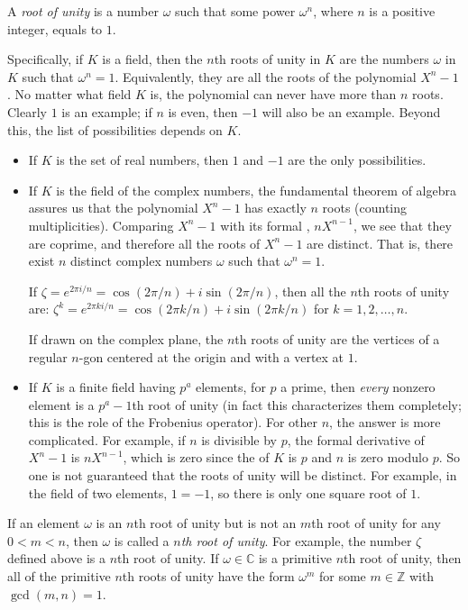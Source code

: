 \documentclass[12pt]{article}
\begin{document}
A \emph{root of unity} is a number $\omega$ such that some power
$\omega^n$, where $n$ is a positive integer, equals to $1$.

Specifically, if $K$ is a field, then the $n$th roots of unity in $K$
are the numbers $\omega$ in $K$ such that $\omega^n = 1$.
Equivalently, they are all the roots of the polynomial $X^n-1$. No
matter what field $K$ is, the polynomial can never have more than $n$
roots.  Clearly $1$ is an example; if $n$ is even, then $-1$ will also
be an example. Beyond this, the list of possibilities depends on $K$.

\begin{itemize} 
\item If $K$ is the set of real numbers, then $1$ and $-1$ are the
only possibilities.

\item If $K$ is the field of the complex numbers, the fundamental
theorem of algebra assures us that the polynomial $X^n-1$ has exactly
$n$ roots (counting multiplicities).  Comparing $X^n-1$ with its
formal , $nX^{n-1}$, we see that they are coprime, and
therefore all the roots of $X^n-1$ are distinct.  That is, there exist
$n$ distinct complex numbers $\omega$ such that $\omega^n=1$.

If $\zeta=e^{2\pi i/n}=\cos(2\pi/n)+i \sin(2\pi/n)$, then all the
$n$th roots of unity are: $\zeta^k=e^{2\pi ki/n}=\cos(2\pi k/n)+i
\sin(2\pi k/n)$ for $k=1,2,\ldots,n$.\medskip

If drawn on the complex plane, the $n$th roots of unity are the
vertices of a regular $n$-gon centered at the origin and with a vertex
at $1$.

\item If $K$ is a finite field having $p^a$ elements, for $p$ a prime,
then \emph{every} nonzero element is a $p^a-1$th root of unity (in
fact this characterizes them completely; this is the role of the
Frobenius operator).  For other $n$, the answer is more complicated.
For example, if $n$ is divisible by $p$, the formal derivative of
$X^n-1$ is $nX^{n-1}$, which is zero since the
 of $K$ is $p$ and $n$ is zero modulo
$p$.  So one is not guaranteed that the roots of unity will be
distinct.  For example, in the field of two elements, $1=-1$, so there
is only one square root of $1$.
\end{itemize}

If an element $\omega$ is an $n$th root of unity but is not an $m$th
root of unity for any $0<m<n$, then $\omega$ is called a
\emph{ $n$th root of unity}.  For example,
the number $\zeta$ defined above is a 
$n$th root of unity.  If $\omega \in \mathbb{C}$ is a primitive $n$th
root of unity, then all of the primitive $n$th roots of unity have the
form $\omega^m$ for some $m \in \mathbb{Z}$ with $\gcd(m,n)=1$.
\end{document}
